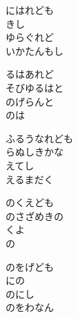 \documentclass[10pt,b5j]{tarticle} %
\begin{document}
\vspace{1.5em} %
\newcommand{\linespace}{0.5em} %
\newcommand{\blocksize}{0.5\hsize} %
\begin{enumerate} %
    \begin{minipage}[c]{\blocksize}
    
        \vspace{\linespace}
        \item
        にはれども\\
        きし\\
        ゆらぐれど\\
        いかたんもし
        
        \vspace{\linespace}
        \item
        るはあれど\\
        そびゆるはと\\
        のげらんと\\
        のは
        
        \vspace{\linespace}
        \item
        ふるうなれども\\
        らぬしきかな\\
        えてし\\
        えるまだく
        
        \vspace{\linespace}
        \item
        のくえども\\
        のさざめきの\\
        くよ\\
        の
        
        \vspace{\linespace}
        \item
        のをげども\\
        にの\\
        のにし\\
        のをわなん
        

\end{minipage}
\end{enumerate}
\end{document}
